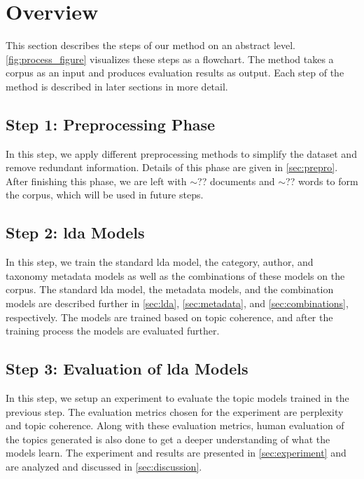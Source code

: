 \section{Overview}\label{sec:overview}
This section describes the steps of our method on an abstract level.
\autoref{fig:process_figure} visualizes these steps as a flowchart.
The method takes a corpus as an input and produces evaluation results as output.
Each step of the method is described in later sections in more detail.

\subsection*{Step 1: Preprocessing Phase}
In this step, we apply different preprocessing methods to simplify the dataset and remove redundant information.
Details of this phase are given in \autoref{sec:prepro}.
After finishing this phase, we are left with $\sim$?? documents and $\sim$?? words to form the corpus, which will be used in future steps.

\subsection*{Step 2: \Gls{lda} Models}
In this step, we train the standard \gls{lda} model, the category, author, and taxonomy metadata models as well as the combinations of these models on the corpus.
The standard \gls{lda} model, the metadata models, and the combination models are described further in \autoref{sec:lda}, \autoref{sec:metadata}, and \autoref{sec:combinations}, respectively.
The models are trained based on topic coherence, and after the training process the models are evaluated further.

\subsection*{Step 3: Evaluation of \gls{lda} Models}
In this step, we setup an experiment to evaluate the topic models trained in the previous step.
The evaluation metrics chosen for the experiment are perplexity and topic coherence.
Along with these evaluation metrics, human evaluation of the topics generated is also done to get a deeper understanding of what the models learn.
The experiment and results are presented in \autoref{sec:experiment} and are analyzed and discussed in \autoref{sec:discussion}.




